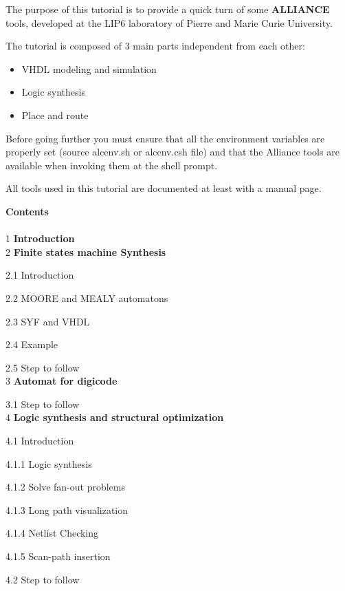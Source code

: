 \documentclass{article}
\begin{document}
\newpage
\large{ The purpose of this tutorial is to provide a quick turn of some { \bf
ALLIANCE } tools, developed at the LIP6 laboratory of Pierre and Marie Curie
University.

The tutorial is composed of 3 main parts independent from each other:

\begin{itemize}\itemsep=-.8ex
\item {VHDL modeling and simulation}
\item {Logic synthesis}
\item {Place and route}
\end{itemize}

Before going further you must ensure that all the environment variables are
properly set (source alcenv.sh or alcenv.csh file)
and that the Alliance tools are available when invoking them at the shell
prompt.

All tools used in this tutorial are documented at least with a
manual page.

\newpage
{\bf Contents}\\
\\
 {1} {\bf Introduction}
\\
 {2} {\bf Finite states machine Synthesis}

 {2.1} Introduction

 {2.2} MOORE and MEALY automatons

 {2.3} SYF and VHDL

 {2.4} Example

 {2.5} Step to follow
\\
 {3} {\bf Automat for digicode}

 {3.1} Step to follow
\\
 {4} {\bf Logic synthesis and structural optimization}

 {4.1} Introduction

\hspace{0.5cm} {4.1.1} Logic synthesis

\hspace{0.5cm} {4.1.2} Solve fan-out problems 

\hspace{0.5cm} {4.1.3} Long path visualization 

\hspace{0.5cm} {4.1.4} Netlist Checking

\hspace{0.5cm} {4.1.5} Scan-path insertion

 {4.2} Step to follow

}
\end{document}
